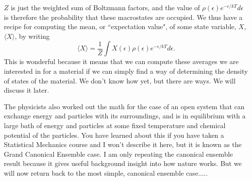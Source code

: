 \documentclass[]{revtex4}
\newcommand{\sm}[1]{{\[#1\]}}
\begin{document}
$Z$ is just the weighted sum of Boltzmann factors, and the value of $\rho(\epsilon)e^{-\epsilon/kT}d\epsilon$ is therefore the probability that these
macrostates are occupied.  We thus have a recipe for computing the mean, or ``expectation value", of some state variable, $X$, $\langle X\rangle$, by
writing
\sm{\langle X\rangle=\frac{1}{Z}\int X(\epsilon)\rho(\epsilon)e^{-\epsilon/kT}d\epsilon.}
This is wonderful because it means that we can compute these averages we are interested in for a material if we can simply find a way of
determining the density of states of the material.  We don't know how yet, but there are ways.  We will discuss it later.

The physicists also worked out the math for the case of an open system that can exchange energy and particles with its surroundings, and
is in equilibrium with a large bath of energy and particles at some fixed temperature and chemical potential of the particles.  You have learned
about this if you have taken a Statistical Mechanics course and I won't describe it here, but it is known as the Grand Canonical Ensemble case.  I am
only repeating the canonical ensemble result because it gives useful background insight into how nature works.  But we will now
return back to the most simple, canonical ensemble case.....

\end{document}
